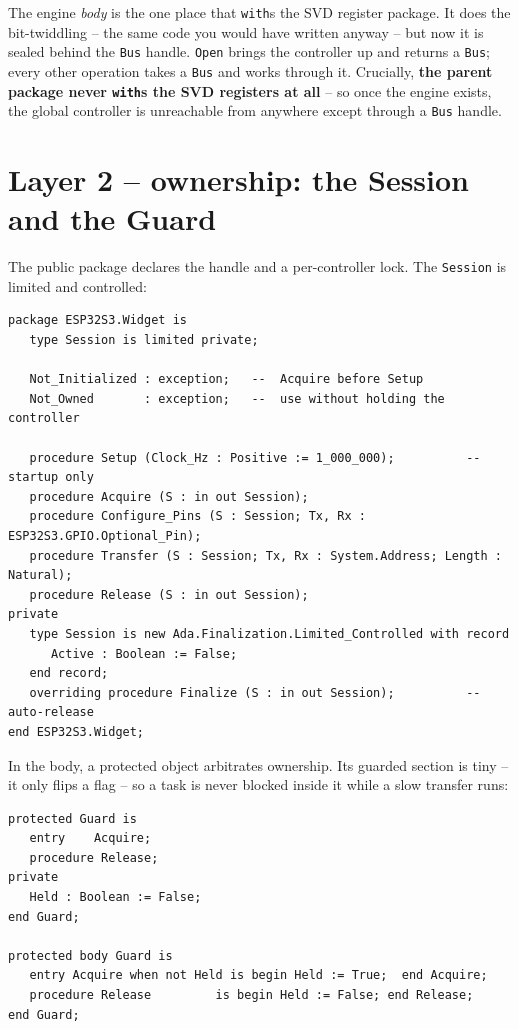 The engine \emph{body} is the one place that \texttt{with}s the SVD register
package. It does the bit-twiddling -- the same code you would have written
anyway -- but now it is sealed behind the \texttt{Bus} handle. \texttt{Open}
brings the controller up and returns a \texttt{Bus}; every other operation takes a
\texttt{Bus} and works through it. Crucially, \textbf{the parent package never
\texttt{with}s the SVD registers at all} -- so once the engine exists, the global
controller is unreachable from anywhere except through a \texttt{Bus} handle.

\section{Layer 2 -- ownership: the Session and the Guard}

The public package declares the handle and a per-controller lock. The
\texttt{Session} is limited and controlled:

\begin{lstlisting}
package ESP32S3.Widget is
   type Session is limited private;

   Not_Initialized : exception;   --  Acquire before Setup
   Not_Owned       : exception;   --  use without holding the controller

   procedure Setup (Clock_Hz : Positive := 1_000_000);          --  startup only
   procedure Acquire (S : in out Session);
   procedure Configure_Pins (S : Session; Tx, Rx : ESP32S3.GPIO.Optional_Pin);
   procedure Transfer (S : Session; Tx, Rx : System.Address; Length : Natural);
   procedure Release (S : in out Session);
private
   type Session is new Ada.Finalization.Limited_Controlled with record
      Active : Boolean := False;
   end record;
   overriding procedure Finalize (S : in out Session);          --  auto-release
end ESP32S3.Widget;
\end{lstlisting}

In the body, a protected object arbitrates ownership. Its guarded section is
tiny -- it only flips a flag -- so a task is never blocked inside it while a
slow transfer runs:

\begin{lstlisting}
protected Guard is
   entry    Acquire;
   procedure Release;
private
   Held : Boolean := False;
end Guard;

protected body Guard is
   entry Acquire when not Held is begin Held := True;  end Acquire;
   procedure Release         is begin Held := False; end Release;
end Guard;
\end{lstlisting}

